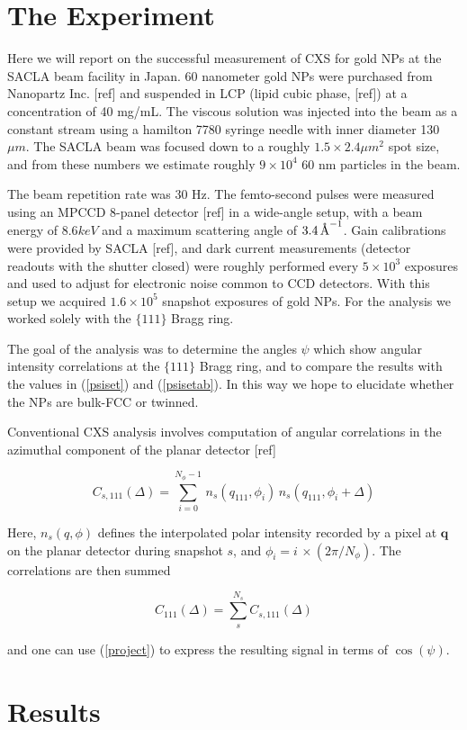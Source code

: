 \documentclass [11pt,fleqn]{article}
\def \be {\begin{equation}}
\def \ee {\end{equation}}
\newcommand{\angstrom}{\textup{\AA}}
\begin{document}
\section{The Experiment}
Here we will report on the successful measurement of CXS for gold NPs at the SACLA beam facility in Japan. 60 nanometer gold NPs were purchased from Nanopartz Inc. [ref] and suspended in LCP (lipid cubic phase, [ref]) at a concentration of 40 mg/mL. The viscous solution was injected into the beam as a constant stream using a  hamilton 7780 syringe needle with inner diameter 130 $\mu m$. The SACLA beam was focused down to a roughly $1.5 \times 2.4 \mu m ^2$ spot size, and from these numbers we estimate roughly $9 \times 10^4$ 60 nm particles in the beam. 

The beam repetition rate was 30 Hz. The femto-second pulses were measured using an MPCCD 8-panel detector [ref] in a wide-angle setup, with a beam energy of $8.6 keV$ and a maximum scattering angle of $3.4 \, \angstrom^{-1}$. Gain calibrations were provided by SACLA [ref], and dark current measurements (detector readouts with the shutter closed) were roughly performed every $5\times 10^3$ exposures and used to adjust for electronic noise common to CCD detectors. With this setup we acquired $1.6\times 10^5$ snapshot exposures of gold NPs. For the analysis we worked solely with the $\{111\}$ Bragg ring.

The goal of the analysis was to determine the angles $\psi$ which show angular intensity correlations at the $\{111\}$ Bragg ring, and to compare the results with the values in (\ref{psiset}) and (\ref{psisetab}). In this way we hope to elucidate whether the NPs are bulk-FCC or twinned.  

Conventional CXS analysis involves computation of angular correlations in the azimuthal component of the planar detector [ref]

\be \label{cor111}
C_{s,111}(\Delta) = \sum_{i=0} ^{N_\phi-1} \, n_s(q_{111},\phi_i)\, n_s(q_{111}, \phi_i+\Delta)
\ee

Here, $n_s(q,\phi)$ defines the interpolated polar intensity recorded by a pixel at $\bm q$ on the planar detector during snapshot $s$, and $\phi_i = i\,\times (2\pi/N_\phi) $. The correlations are then summed

\be
C_{111}(\Delta) = \sum_{s}^{N_s} C_{s,111}(\Delta)
\ee

and one can use (\ref{project}) to express the resulting signal in terms of $\cos(\psi)$.

\section{Results}
\end{document}
